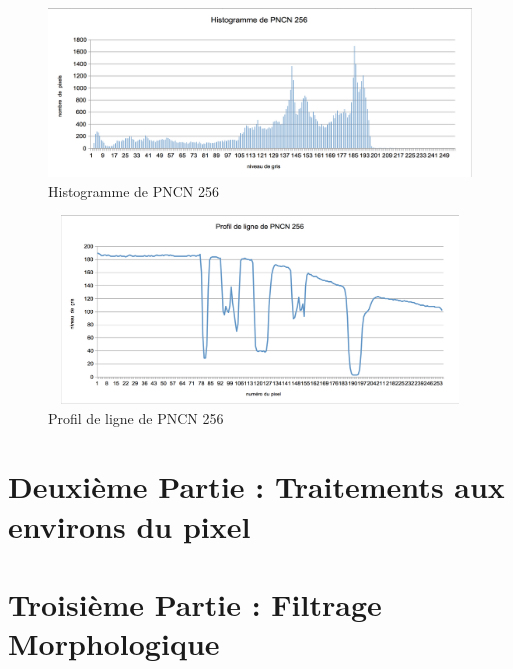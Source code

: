 \documentclass{scrreprt}
\begin{document}
\begin{figure}[!h]
\centering
\includegraphics[width=15cm]{images/histogramme2.png}
\caption{Histogramme de PNCN 256}
\end{figure}

\begin{figure}[!h]
\centering
\includegraphics[height=5cm,width=15cm]{images/profildeligne2.png}
\caption{Profil de ligne de PNCN 256}
\end{figure}

\chapter{Deuxième Partie : Traitements aux environs du pixel}

\chapter{Troisième Partie : Filtrage Morphologique}
\end{document}
